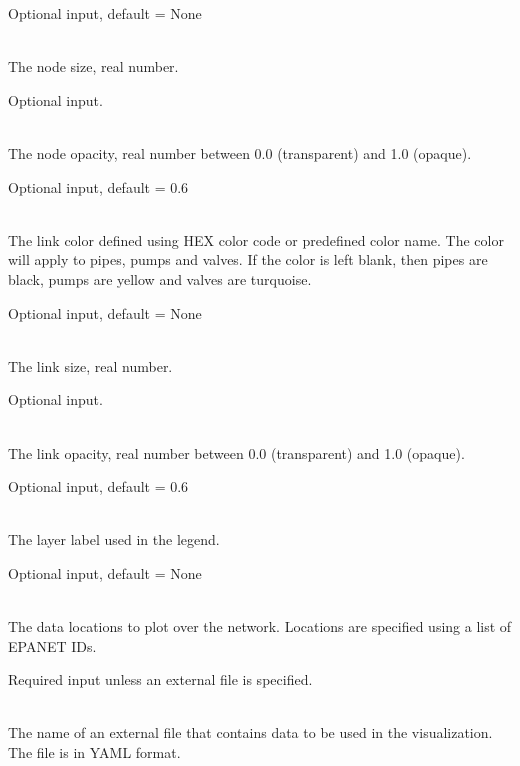 \begin{description}[topsep=0pt,parsep=0.5em,itemsep=-0.4em]
\begin{description}[topsep=0pt,parsep=0.5em,itemsep=-0.4em]
\begin{description}[topsep=0pt,parsep=0.5em,itemsep=-0.4em]
                Optional input, default = None
      \item[{size}]\hfill
\\The node size, real number.
                
                Optional input.
      \item[{opacity}]\hfill
\\The node opacity, real number between 0.0 (transparent) and 1.0 (opaque).
                
                Optional input, default = 0.6
    \end{description}
    \item[{links}]\hfill
    \begin{description}[topsep=0pt,parsep=0.5em,itemsep=-0.4em]
      \item[{color}]\hfill
\\The link color defined using HEX color code or predefined color name.
                The color will apply to pipes, pumps and valves. If the 
                color is left blank, then pipes are black, pumps are 
                yellow and valves are turquoise.
                
                Optional input, default = None
      \item[{size}]\hfill
\\The link size, real number.
                
                Optional input.
      \item[{opacity}]\hfill
\\The link opacity, real number between 0.0 (transparent) and 1.0 (opaque).
                
                Optional input, default = 0.6
    \end{description}
    \item[{layers}]\hfill
    \begin{description}[topsep=0pt,parsep=0.5em,itemsep=-0.4em]
      \item[{label}]\hfill
\\The layer label used in the legend. 
                
                Optional input, default = None
      \item[{locations}]\hfill
\\
                The data locations to plot over the network. Locations are specified
                using a list of EPANET IDs.
                
                Required input unless an external file is specified.
      \item[{file}]\hfill
\\The name of an external file that contains data to be used in the visualization.
                The file is in YAML format. 
                

\end{description}
\end{description}
\end{description}
